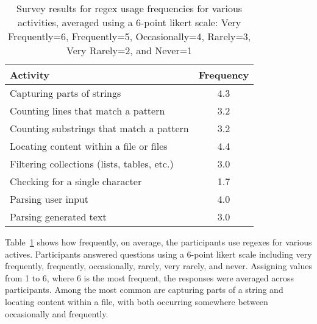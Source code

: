 \begin{table}
\caption{Survey results for regex usage frequencies for various activities, averaged using a 6-point likert scale: Very Frequently=6, Frequently=5, Occasionally=4, Rarely=3, Very Rarely=2, and Never=1 \label{tab:regexactivities}}
\begin{center}
\begin{tabular}{l|c}
Activity & Frequency \\ \hline
Capturing parts of strings & 4.3 \\
Counting lines that match a pattern & 3.2\\
Counting  substrings that match a pattern & 3.2\\
Locating content within a file or files & 4.4\\
Filtering collections (lists, tables, etc.) & 3.0 \\
Checking for a single character & 1.7\\
Parsing user input & 4.0\\
Parsing generated text & 3.0\\

\end{tabular}
\end{center}
\end{table}

Table~\ref{tab:regexactivities} shows how frequently, on average, the participants use
regexes for various actives.
Participants answered questions using a 6-point likert scale including very frequently, frequently, occasionally, rarely, very rarely, and never.
Assigning values from 1 to 6, where 6 is the most frequent, the responses were averaged across participants.
Among the most common are capturing parts of a string and locating content within a file, with both occurring somewhere between occasionally and frequently. 


